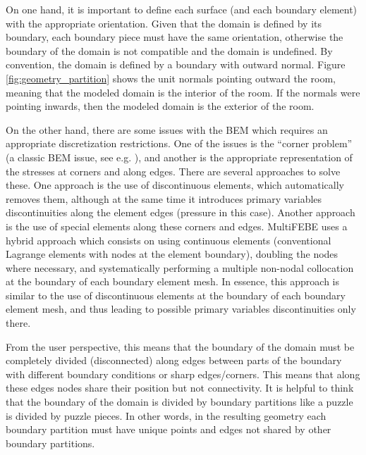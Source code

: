 \documentclass[a4]{article}
\begin{document}
On one hand, it is important to define each surface (and each boundary element) with the appropriate orientation. Given that the domain is defined by its boundary, each boundary piece must have the same orientation, otherwise the boundary of the domain is not compatible and the domain is undefined. By convention, the domain is defined by a boundary with outward normal. Figure \ref{fig:geometry_partition} shows the unit normals pointing outward the room, meaning that the modeled domain is the interior of the room. If the normals were pointing inwards, then the modeled domain is the exterior of the room.

On the other hand, there are some issues with the BEM which requires an appropriate discretization restrictions. One of the issues is the ``corner problem'' (a classic BEM issue, see e.g. \cite{brebbia}), and another is the appropriate representation of the stresses at corners and along edges. There are several approaches to solve these. One approach is the use of discontinuous elements, which automatically removes them, although at the same time it introduces primary variables discontinuities along the element edges (pressure in this case). Another approach is the use of special elements along these corners and edges. MultiFEBE uses a hybrid approach which consists on using continuous elements (conventional Lagrange elements with nodes at the element boundary), doubling the nodes where necessary, and  systematically performing a multiple non-nodal collocation at the boundary of each boundary element mesh. In essence, this approach is similar to the use of discontinuous elements at the boundary of each boundary element mesh, and thus leading to possible primary variables discontinuities only there.

From the user perspective, this means that the boundary of the domain must be completely divided (disconnected) along edges between parts of the boundary with different boundary conditions or sharp edges/corners. This means that along these edges nodes share their position but not connectivity. It is helpful to think that the boundary of the domain is divided by boundary partitions like a puzzle is divided by puzzle pieces. In other words, in the resulting geometry each boundary partition must have unique points and edges not shared by other boundary partitions.
\end{document}
